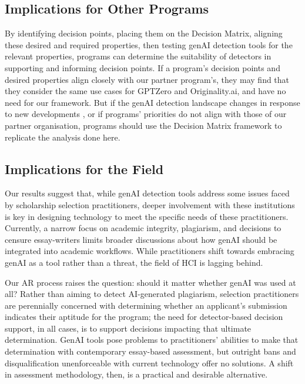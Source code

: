 \subsection{Implications for Other Programs}
By identifying decision points, placing them on the Decision Matrix, aligning these desired and required properties, then testing genAI detection tools for the relevant properties, programs can determine the suitability of detectors in supporting and informing decision points. If a program's decision points and desired properties align closely with our partner program's, they may find that they consider the same use cases for GPTZero and Originality.ai, and have no need for our framework. But if the genAI detection landscape changes in response to new developments \cite{ashish_vaswani_attention_2017,jacob_devlin_bert_2018,openai_gpt-4_2023,liang_gpt_2023,mitchell_detectgpt_2023,liu_deid-gpt_2023,kalpesh_krishna_paraphrasing_2023}, or if programs' priorities do not align with those of our partner organisation, programs should use the Decision Matrix framework to replicate the analysis done here.

\subsection{Implications for the Field}
Our results suggest that, while genAI detection tools address some issues faced by scholarship selection practitioners, deeper involvement with these institutions is key in designing technology to meet the specific needs of these practitioners. Currently, a narrow focus on academic integrity, plagiarism, and decisions to censure essay-writers limits broader discussions about how genAI should be integrated into academic workflows. While practitioners shift towards embracing genAI as a tool rather than a threat, the field of HCI is lagging behind. 

Our AR process raises the question: should it matter whether genAI was used at all? Rather than aiming to detect AI-generated plagiarism, selection practitioners are perennially concerned with determining whether an applicant's submission indicates their aptitude for the program; the need for detector-based decision support, in all cases, is to support decisions impacting that ultimate determination. GenAI tools pose problems to practitioners' abilities to make that determination with contemporary essay-based assessment, but outright bans and disqualification \cite{h_holden_thorp_chatgpt_2023} unenforceable with current technology offer no solutions. A shift in assessment methodology, then, is a practical and desirable alternative.

